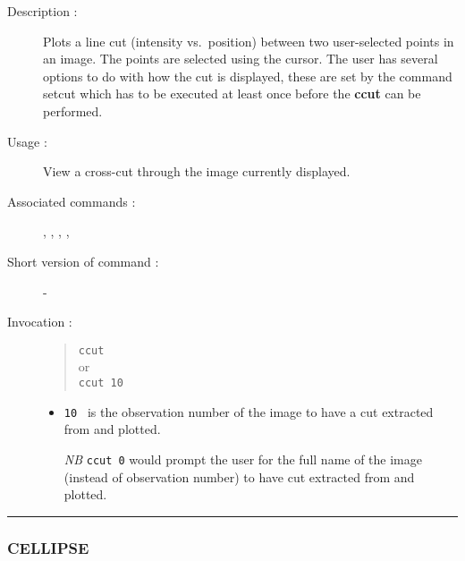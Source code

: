 \begin{description}

\item[Description :] Plots a line cut (intensity vs.\ position) between two
user-selected points in an image.  The points are selected using the
cursor.  The user has several options to do with how the cut is
displayed, these are set by the command setcut which has to be executed
at least once before the {\bf ccut} can be performed.  

\item[Usage :] View a cross-cut through the image currently displayed.
\item[Associated commands :] {\tt {}}, 
{\tt {}}, {\tt {}}, 
{\tt {}}, {\tt {}}
\item[Short version of command :] -
\item[Invocation :]

\begin{quote}{\tt  ccut }\\
or \\
{\tt  ccut 10 }
\end{quote}

\begin{itemize}

\item {\tt 10 } is the observation number of the image to have a cut
extracted from and plotted.

\emph{NB} {\tt ccut 0}  would prompt the user for the full name of the image
(instead of observation number) to have cut extracted from and plotted.

\end{itemize}

\end{description}

\hrule 
\subsubsection*{\label{CELLIPSE}CELLIPSE}

